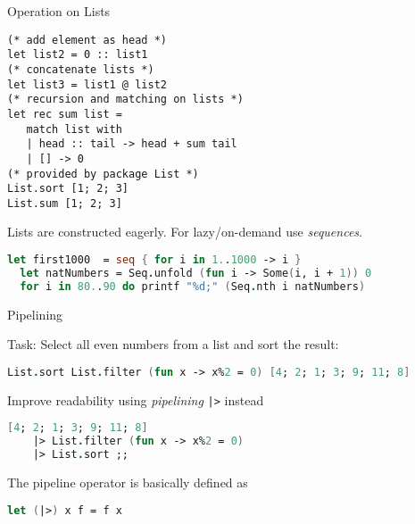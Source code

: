 \documentclass{beamer}
\newcommand{\Blue}[1]{\color{blue}#1\color{black}\xspace}
\begin{document}
\begin{frame}[fragile]{Operation on Lists}
\begin{lstlisting}
(* add element as head *)
let list2 = 0 :: list1
(* concatenate lists *)
let list3 = list1 @ list2
(* recursion and matching on lists *)
let rec sum list =
   match list with
   | head :: tail -> head + sum tail
   | [] -> 0
(* provided by package List *)
List.sort [1; 2; 3]
List.sum [1; 2; 3]
\end{lstlisting}

\pause

Lists are constructed eagerly. For lazy/on-demand use \emph{sequences}.

\begin{lstlisting}[language=FSharp]
  let first1000  = seq { for i in 1..1000 -> i }
  let natNumbers = Seq.unfold (fun i -> Some(i, i + 1)) 0
  for i in 80..90 do printf "%d;" (Seq.nth i natNumbers)
\end{lstlisting}

\end{frame}

\begin{frame}[fragile]{Pipelining}

\Blue{Task:} Select all even numbers from a list and sort the result:

\pause

\begin{lstlisting}[language=FSharp]
  List.sort List.filter (fun x -> x%2 = 0) [4; 2; 1; 3; 9; 11; 8]
\end{lstlisting}

\pause\bigskip

Improve readability using \emph{pipelining} \lstinline!|>! instead 

\begin{lstlisting}[language=FSharp]
  [4; 2; 1; 3; 9; 11; 8] 
    |> List.filter (fun x -> x%2 = 0) 
    |> List.sort ;;
\end{lstlisting}

\pause\bigskip

The pipeline operator is basically defined as

\begin{lstlisting}[language=FSharp]
  let (|>) x f = f x 
\end{lstlisting}
\end{frame}
\end{document}
